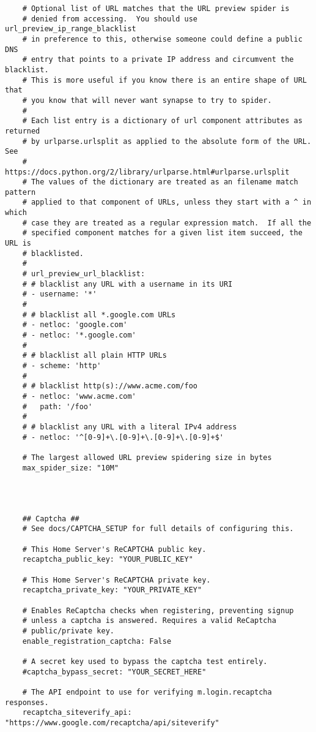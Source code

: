 \begin{lstlisting}
    # Optional list of URL matches that the URL preview spider is
    # denied from accessing.  You should use url_preview_ip_range_blacklist
    # in preference to this, otherwise someone could define a public DNS
    # entry that points to a private IP address and circumvent the blacklist.
    # This is more useful if you know there is an entire shape of URL that
    # you know that will never want synapse to try to spider.
    #
    # Each list entry is a dictionary of url component attributes as returned
    # by urlparse.urlsplit as applied to the absolute form of the URL.  See
    # https://docs.python.org/2/library/urlparse.html#urlparse.urlsplit
    # The values of the dictionary are treated as an filename match pattern
    # applied to that component of URLs, unless they start with a ^ in which
    # case they are treated as a regular expression match.  If all the
    # specified component matches for a given list item succeed, the URL is
    # blacklisted.
    #
    # url_preview_url_blacklist:
    # # blacklist any URL with a username in its URI
    # - username: '*'
    #
    # # blacklist all *.google.com URLs
    # - netloc: 'google.com'
    # - netloc: '*.google.com'
    #
    # # blacklist all plain HTTP URLs
    # - scheme: 'http'
    #
    # # blacklist http(s)://www.acme.com/foo
    # - netloc: 'www.acme.com'
    #   path: '/foo'
    #
    # # blacklist any URL with a literal IPv4 address
    # - netloc: '^[0-9]+\.[0-9]+\.[0-9]+\.[0-9]+$'
    
    # The largest allowed URL preview spidering size in bytes
    max_spider_size: "10M"
    
    
    
    
    ## Captcha ##
    # See docs/CAPTCHA_SETUP for full details of configuring this.
    
    # This Home Server's ReCAPTCHA public key.
    recaptcha_public_key: "YOUR_PUBLIC_KEY"
    
    # This Home Server's ReCAPTCHA private key.
    recaptcha_private_key: "YOUR_PRIVATE_KEY"
    
    # Enables ReCaptcha checks when registering, preventing signup
    # unless a captcha is answered. Requires a valid ReCaptcha
    # public/private key.
    enable_registration_captcha: False
    
    # A secret key used to bypass the captcha test entirely.
    #captcha_bypass_secret: "YOUR_SECRET_HERE"
    
    # The API endpoint to use for verifying m.login.recaptcha responses.
    recaptcha_siteverify_api: "https://www.google.com/recaptcha/api/siteverify"
    

\end{lstlisting}
